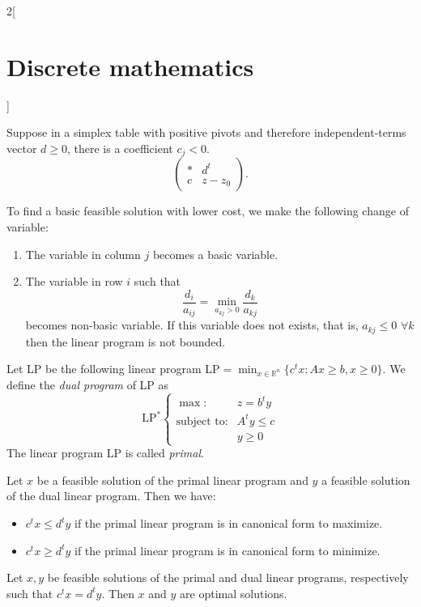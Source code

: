 \documentclass[class=article,10pt,crop=false]{standalone}
\begin{document}
\begin{multicols}{2}[\section{Discrete mathematics}]
\begin{definition}
\end{definition}
\begin{prop}
Suppose in a simplex table with positive pivots and therefore independent-terms vector $d\geq 0$, there is a coefficient $c_j<0$. $$\left(\begin{array}{c|c}
    * & d^t\\
    \hline
    c & z-z_0
\end{array}\right).$$
\end{prop}
To find a basic feasible solution with lower cost, we make the following change of variable:
\begin{enumerate}
    \item The variable in column $j$ becomes a basic variable.
    \item The variable in row $i$ such that $$\frac{d_i}{a_{ij}}=\min_{a_{kj}>0}\frac{d_k}{a_{kj}}$$ becomes non-basic variable. If this variable does not exists, that is, $a_{kj}\leq0$ $\forall k$ then the linear program is not bounded.
\end{enumerate}
\begin{definition}
Let LP be the following linear program $\text{LP}=\displaystyle\min_{x\in\mathbb{R}^n}\{c^tx:Ax\geq b,x\geq 0\}$. We define the \textit{dual program} of LP as $$\text{LP}^*\left\{\begin{array}{rc}
    \max: & z=b^ty \\
    \text{subject to}: & A^ty\leq c\\
     & y\geq 0
    \end{array}\right.$$ The linear program LP is called \textit{primal}.
\end{definition}
\begin{theorem}
Let $x$ be a feasible solution of the primal linear program and $y$ a feasible solution of the dual linear program. Then we have:
\begin{itemize}
    \item $c^tx\leq d^ty$ if the primal linear program is in canonical form to maximize.
    \item $c^tx\geq d^ty$ if the primal linear program is in canonical form to minimize.
\end{itemize}
\end{theorem}
\begin{corollary}
Let $x,y$ be feasible solutions of the primal and dual linear programs, respectively such that $c^tx=d^ty$. Then $x$ and $y$ are optimal solutions.
\end{corollary}

\end{multicols}
\end{document}
